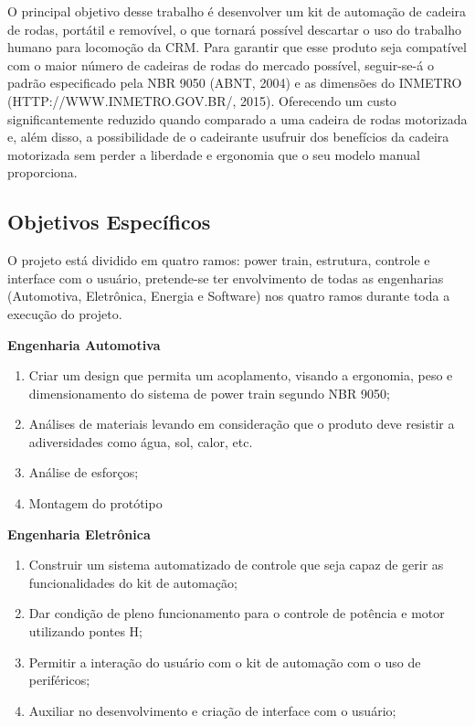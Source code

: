 O principal objetivo desse trabalho é desenvolver um kit de automação de cadeira de rodas, portátil e removível, o que tornará possível descartar o uso do trabalho humano para locomoção da CRM. Para garantir que esse produto seja compatível com o maior número de cadeiras de rodas do mercado possível, seguir-se-á o padrão especificado pela NBR 9050 (ABNT, 2004) e as dimensões do INMETRO (HTTP://WWW.INMETRO.GOV.BR/, 2015). Oferecendo um custo significantemente reduzido quando comparado a uma cadeira de rodas motorizada e, além disso, a possibilidade de o cadeirante usufruir dos benefícios da cadeira motorizada sem perder a liberdade e ergonomia que o seu modelo manual proporciona.

\subsection{Objetivos Específicos}

O projeto está dividido em quatro ramos: power train, estrutura, controle e interface com o usuário, pretende-se ter envolvimento de todas as engenharias (Automotiva, Eletrônica, Energia e Software) nos quatro ramos durante toda a execução do projeto.

\textbf{Engenharia Automotiva}

  \begin{enumerate}
    \item Criar um design que permita um acoplamento, visando a ergonomia, peso e dimensionamento do sistema de power train segundo NBR 9050;
    \item Análises de materiais levando em consideração que o produto deve resistir a adiversidades como água, sol, calor, etc.
    \item Análise de esforços;
    \item Montagem do protótipo
  \end{enumerate}

\textbf{Engenharia Eletrônica}
  \begin{enumerate}
    \item Construir um sistema automatizado de controle que seja capaz de gerir as funcionalidades do kit de automação;
    \item Dar condição de pleno funcionamento para o controle de potência e motor utilizando pontes H;
    \item Permitir a interação do usuário com o kit de automação com o uso de periféricos;
    \item Auxiliar no desenvolvimento e criação de interface com o usuário;
  \end{enumerate}

